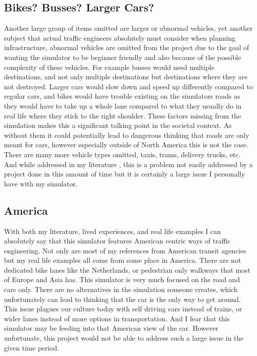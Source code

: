 \documentclass[10pt,twocolumn]{article}
\begin{document}
\subsection{Bikes? Busses? Larger Cars?}
Another large group of items omitted are larger or abnormal vehicles, yet another subject that actual traffic engineers absolutely must consider when planning infrastructure, abnormal vehicles are omitted from the project due to the goal of wanting the simulator to be beginner friendly and also because of the possible complexity of these vehicles. For example busses would need multiple destinations, and not only multiple destinations but destinations where they are not destroyed. Larger cars would slow down and speed up differently compared to regular cars, and bikes would have trouble existing on the simulators roads as they would have to take up a whole lane compared to what they usually do in real life where they stick to the right shoulder. These factors missing from the simulation makes this a significant talking point in the societal context. As without them it could potentially lead to dangerous thinking that roads are only meant for cars, however especially outside of North America this is not the case. There are many more vehicle types omitted, taxis, trams, delivery trucks, etc. And while addressed in my literature \cite{StreetElementsToolbox}, this is a problem not easily addressed by a project done in this amount of time but it is certainly a large issue I personally have with my simulator. 
\subsection{America}
With both my literature, lived experiences, and real life examples I can absolutely say that this simulator features American centric ways of traffic engineering. Not only are most of my references from American transit agencies but my real life examples all come from some place in America. There are not dedicated bike lanes like the Netherlands, or pedestrian only walkways that most of Europe and Asia has. This simulator is very much focused on the road and cars only. There are no alternatives in the simulation someone creates, which unfortunately can lead to thinking that the car is the only way to get around. This issue plagues our culture today with self driving cars instead of trains, or wider lanes instead of more options in transportation. And I fear that this simulator may be feeding into that American view of the car. However unfortunate, this project would not be able to address such a large issue in the given time period.
\end{document}
